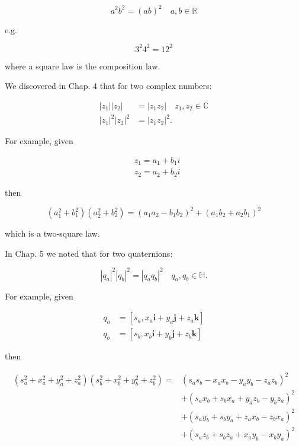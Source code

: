 $$
a^{2} b^{2}=(a b)^{2} \quad a, b \in \mathbb{R}
$$

e.g.

$$
3^{2} 4^{2}=12^{2}
$$

where a square law is the composition law.

We discovered in Chap. 4 that for two complex numbers:

$$
\begin{aligned}
\left|z_{1}\right|\left|z_{2}\right| & =\left|z_{1} z_{2}\right| \quad z_{1}, z_{2} \in \mathbb{C} \\
\left|z_{1}\right|^{2}\left|z_{2}\right|^{2} & =\left|z_{1} z_{2}\right|^{2} .
\end{aligned}
$$

For example, given

$$
\begin{aligned}
& z_{1}=a_{1}+b_{1} i \\
& z_{2}=a_{2}+b_{2} i
\end{aligned}
$$

then

$$
\left(a_{1}^{2}+b_{1}^{2}\right)\left(a_{2}^{2}+b_{2}^{2}\right)=\left(a_{1} a_{2}-b_{1} b_{2}\right)^{2}+\left(a_{1} b_{2}+a_{2} b_{1}\right)^{2}
$$

which is a two-square law.

In Chap. 5 we noted that for two quaternions:

$$
\left|q_{a}\right|^{2}\left|q_{b}\right|^{2}=\left|q_{a} q_{b}\right|^{2} \quad q_{a}, q_{b} \in \mathbb{H} .
$$

For example, given

$$
\begin{aligned}
q_{a} & =\left[s_{a}, x_{a} \mathbf{i}+y_{a} \mathbf{j}+z_{a} \mathbf{k}\right] \\
q_{b} & =\left[s_{b}, x_{b} \mathbf{i}+y_{b} \mathbf{j}+z_{b} \mathbf{k}\right]
\end{aligned}
$$

then

$$
\begin{aligned}
\left(s_{a}^{2}+x_{a}^{2}+y_{a}^{2}+z_{a}^{2}\right)\left(s_{b}^{2}+x_{b}^{2}+y_{b}^{2}+z_{b}^{2}\right)= & \left(s_{a} s_{b}-x_{a} x_{b}-y_{a} y_{b}-z_{a} z_{b}\right)^{2} \\
& +\left(s_{a} x_{b}+s_{b} x_{a}+y_{a} z_{b}-y_{b} z_{a}\right)^{2} \\
& +\left(s_{a} y_{b}+s_{b} y_{a}+z_{a} x_{b}-z_{b} x_{a}\right)^{2} \\
& +\left(s_{a} z_{b}+s_{b} z_{a}+x_{a} y_{b}-x_{b} y_{a}\right)^{2}
\end{aligned}
$$

